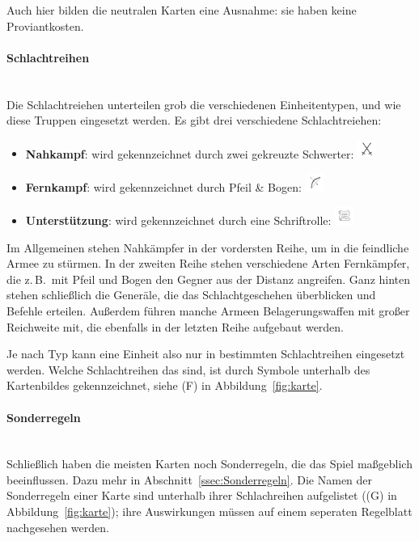\documentclass[a4paper,11pt]{report}
\newcommand{\fref}[1]{Abbildung~\ref{#1}}
\newcommand{\sref}[1]{Abschnitt~\ref{#1}}
\begin{document}
Auch hier bilden die neutralen Karten eine Ausnahme: sie haben keine Proviantkosten.

\paragraph{Schlachtreihen}~\\
Die Schlachtreiehen unterteilen grob die verschiedenen Einheitentypen, und wie diese Truppen eingesetzt werden. Es gibt drei verschiedene Schlachtreiehen:

\begin{itemize}
	\item \textbf{Nahkampf}: wird gekennzeichnet durch zwei gekreuzte Schwerter: \includegraphics[height=0.6cm] {../img/symbol_sword.jpg}
	\item \textbf{Fernkampf}: wird gekennzeichnet durch Pfeil \& Bogen: \includegraphics[height=0.6cm] {../img/symbol_bow.jpg}
	\item \textbf{Unterstützung}: wird gekennzeichnet durch eine Schriftrolle: \includegraphics[height=0.6cm] {../img/symbol_scroll.jpg}
\end{itemize}
Im Allgemeinen stehen Nahkämpfer in der vordersten Reihe, um in die feindliche Armee zu stürmen. In der zweiten Reihe stehen verschiedene Arten Fernkämpfer, die z.\,B.\ mit Pfeil und Bogen den Gegner aus der Distanz angreifen. Ganz hinten stehen schließlich die Generäle, die das Schlachtgeschehen überblicken und Befehle erteilen. Außerdem führen manche Armeen Belagerungswaffen mit großer Reichweite mit, die ebenfalls in der letzten Reihe aufgebaut werden.

Je nach Typ kann eine Einheit also nur in bestimmten Schlachtreihen eingesetzt werden. Welche Schlachtreihen das sind, ist durch Symbole unterhalb des Kartenbildes gekennzeichnet, siehe (F) in \fref{fig:karte}.

\paragraph{Sonderregeln}~\\
Schließlich haben die meisten Karten noch Sonderregeln, die das Spiel maßgeblich beeinflussen. Dazu mehr in \sref{ssec:Sonderregeln}. Die Namen der Sonderregeln einer Karte sind unterhalb ihrer Schlachreihen aufgelistet ((G) in \fref{fig:karte}); ihre Auswirkungen müssen auf einem seperaten Regelblatt nachgesehen werden.
\end{document}
